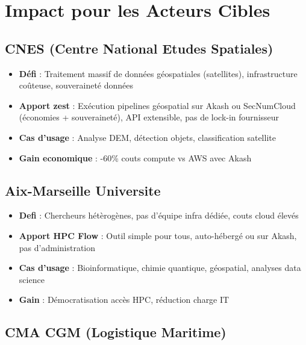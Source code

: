 \documentclass[11pt,a4paper]{article}
\begin{document}
	\newpage
	
	\section{Impact pour les Acteurs Cibles}
	
	\subsection{CNES (Centre National Etudes Spatiales)}
	
	\begin{itemize}
		\item \textbf{Défi} : Traitement massif de données géospatiales (satellites), infrastructure coûteuse, souveraineté données
		\item \textbf{Apport zest} : Exécution pipelines géospatial sur Akash ou SecNumCloud (économies + souveraineté), API extensible, pas de lock-in fournisseur
		\item \textbf{Cas d'usage} : Analyse DEM, détection objets, classification satellite
		\item \textbf{Gain economique} : -60\% couts compute vs AWS avec Akash
	\end{itemize}
	
	\subsection{Aix-Marseille Universite}
	
	\begin{itemize}
		\item \textbf{Defi} : Chercheurs hétèrogènes, pas d'équipe infra dédiée, couts cloud élevés
		\item \textbf{Apport HPC Flow} : Outil simple pour tous, auto-hébergé ou sur Akash, pas d'administration
		\item \textbf{Cas d'usage} : Bioinformatique, chimie quantique, géospatial, analyses data science
		\item \textbf{Gain} : Démocratisation accès HPC, réduction charge IT
	\end{itemize}
	
	\subsection{CMA CGM (Logistique Maritime)}
	
\end{document}

